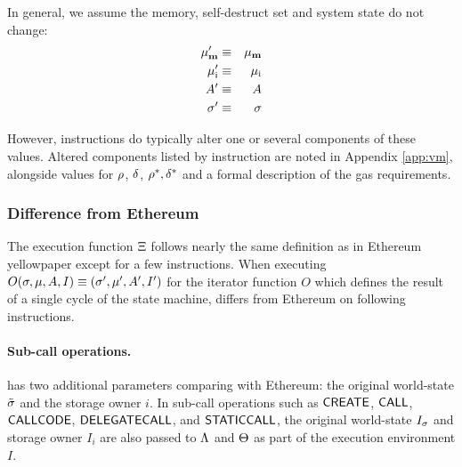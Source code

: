 In general, we assume the memory, self-destruct set and system state do not change:
\begin{eqnarray}
\mathbf{\mu}'_{\mathbf{m}} & \equiv & \mathbf{\mu}_{\mathbf{m}} \\
\mathbf{\mu}'_{\mathrm{i}} & \equiv & \mathbf{\mu}_{\mathrm{i}} \\
A' & \equiv & A \\
\mathbf{\sigma}' & \equiv & \mathbf{\sigma}
\end{eqnarray}

However, instructions do typically alter one or several components of these values. Altered components listed by instruction are noted in Appendix \ref{app:vm}, alongside values for $\mathbf{\rho}$, $\mathbf{\delta}$, $\mathbf{\rho}^*,\mathbf{\delta}^*$ and a formal description of the gas requirements.

\subsubsection{Difference from Ethereum}
The execution function $\mathrm{\Xi}$ follows nearly the same definition as in Ethereum yellowpaper \cite{ETH_yellow} except for a few instructions. 
When executing $O(\mathbf{\sigma}, \mu, A, I) \equiv (\mathbf{\sigma}' , \mu' , A' , I')$ 
for the iterator function $O$ which defines the result of a single cycle of the state machine,
{\name} differs from Ethereum on following instructions. 




\paragraph{Sub-call operations.} 
{\name} has two additional parameters comparing with Ethereum: 
the original world-state $\tilde{\mathbf{\sigma}}$ and the storage owner $i$.
In sub-call operations such as $\mathsf{CREATE}$, $\mathsf{CALL}$, $\mathsf{CALLCODE}$, $\mathsf{DELEGATECALL}$, and $\mathsf{STATICCALL}$,  
the original world-state $I_{\mathbf{\sigma}}$ and storage owner $I_i$ are also passed to $\mathrm{\Lambda}$ and $\mathrm{\Theta}$ as part of the execution environment $I$. 

